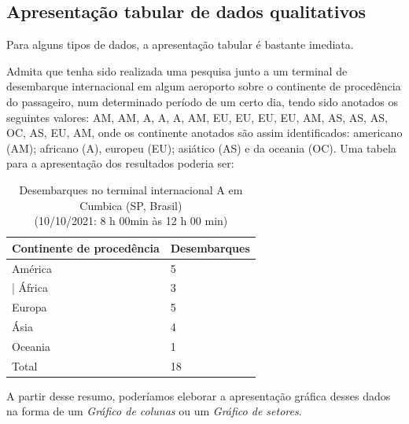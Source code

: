 \documentclass[
]{book}
\begin{document}
\hfill\break

\hypertarget{apresentauxe7uxe3o-tabular-de-dados-qualitativos}{%
\subsection{Apresentação tabular de dados qualitativos}\label{apresentauxe7uxe3o-tabular-de-dados-qualitativos}}

\hfill\break

Para alguns tipos de dados, a apresentação tabular é bastante imediata.

\hfill\break

Admita que tenha sido realizada uma pesquisa junto a um terminal de desembarque internacional em algum aeroporto sobre o continente de procedência do passageiro, num determinado período de um certo dia, tendo sido anotados os seguintes valores: AM, AM, A, A, A, AM, EU, EU, EU, EU, AM, AS, AS, AS, OC, AS, EU, AM, onde os continente anotados são assim identificados: americano (AM); africano (A), europeu (EU); asiático (AS) e da oceania (OC). Uma tabela para a apresentação dos resultados poderia ser:

\hfill\break

\begin{table}[h]
\centering
\caption{Desembarques no terminal internacional A em Cumbica (SP, Brasil) \\\hspace{\textwidth} (10/10/2021: 8 h 00min às 12 h 00 min)}
\begin{tabular}{|l|l|}
\hline
Continente de procedência   &  Desembarques  \\
\hline
América & 5 \\                                |
África  & 3 \\                           
Europa  & 5 \\                          
Ásia    & 4 \\                          
Oceania & 1 \\                        
\hline
Total  & 18 \\   
\hline
\end{tabular}
\end{table} 

\hfill\break

A partir desse resumo, poderíamos eleborar a apresentação gráfica desses dados na forma de um \emph{Gráfico de colunas} ou um \emph{Gráfico de setores}.

\hfill\break
\end{document}
